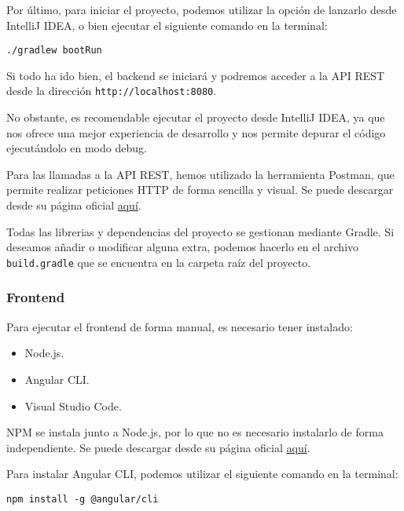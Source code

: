 Por último, para iniciar el proyecto, podemos utilizar la opción de lanzarlo desde IntelliJ IDEA, o bien
ejecutar el siguiente comando en la terminal:
\begin{verbatim}
./gradlew bootRun
\end{verbatim}

Si todo ha ido bien, el backend se iniciará y podremos acceder a la API REST desde la dirección \texttt{http://localhost:8080}.


No obstante, es recomendable ejecutar el proyecto desde IntelliJ IDEA, ya que nos ofrece una mejor experiencia de
desarrollo y nos permite depurar el código ejecutándolo en modo debug.


Para las llamadas a la API REST, hemos utilizado la herramienta Postman, que permite realizar peticiones HTTP
de forma sencilla y visual.
Se puede descargar desde su página oficial \href{https://www.postman.com/downloads/}{aquí}.

Todas las librerias y dependencias del proyecto se gestionan mediante Gradle.
Si deseamos añadir o modificar alguna extra, podemos hacerlo en el archivo \texttt{build.gradle} que se encuentra
en la carpeta raíz del proyecto.

\subsubsection{Frontend}

Para ejecutar el frontend de forma manual, es necesario tener instalado:

\begin{itemize}
    \tightlist
    \item Node.js.
    \item Angular CLI\@.
    \item Visual Studio Code\@.
\end{itemize}

NPM se instala junto a Node.js, por lo que no es necesario instalarlo de forma independiente.
Se puede descargar desde su página oficial \href{https://nodejs.org/es/download/}{aquí}.

Para instalar Angular CLI, podemos utilizar el siguiente comando en la terminal:
\begin{verbatim}
npm install -g @angular/cli
\end{verbatim}


